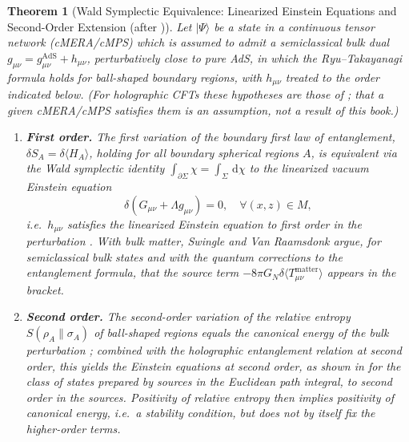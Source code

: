 \documentclass[11pt,a4paper,reqno]{amsart}
\newtheorem{theorem}{Theorem}[section]
\theoremstyle{definition}
\numberwithin{equation}{section}
\newcommand{\dif}{\,\mathrm{d}}
\begin{document}
\begin{theorem}[Wald Symplectic Equivalence: Linearized Einstein Equations and Second-Order Extension (after \cite{faulkner2014gravitation, faulkner2017nonlinear})]
\label{thm:grand_einstein_emergence}
Let $|\Psi\rangle$ be a state in a continuous tensor network (cMERA/cMPS) which is \emph{assumed} to admit a semiclassical bulk dual $g_{\mu\nu} = g_{\mu\nu}^{\mathrm{AdS}} + h_{\mu\nu}$, perturbatively close to pure AdS, in which the Ryu--Takayanagi formula holds for ball-shaped boundary regions, with $h_{\mu\nu}$ treated to the order indicated below. (For holographic CFTs these hypotheses are those of \cite{faulkner2014gravitation, faulkner2017nonlinear}; that a given cMERA/cMPS satisfies them is an assumption, not a result of this book.)
\begin{enumerate}[label=(\roman*)]
    \item \textbf{First order.} The first variation of the boundary first law of entanglement, $\delta S_A = \delta \langle H_A \rangle$, holding for all boundary spherical regions $A$, is equivalent via the Wald symplectic identity $\int_{\partial \Sigma} \chi = \int_\Sigma \dif \chi$ to the \emph{linearized} vacuum Einstein equation
    \begin{equation}
        \delta\!\left( G_{\mu\nu} + \Lambda g_{\mu\nu} \right) = 0, \quad \forall (x, z) \in M,
    \end{equation}
    i.e.\ $h_{\mu\nu}$ satisfies the linearized Einstein equation to first order in the perturbation \cite{faulkner2014gravitation}. With bulk matter, Swingle and Van Raamsdonk \cite{swingle2014universality} argue, for semiclassical bulk states and with the quantum corrections to the entanglement formula, that the source term $-8\pi G_N \delta\langle T_{\mu\nu}^{\mathrm{matter}}\rangle$ appears in the bracket.
    \item \textbf{Second order.} The second-order variation of the relative entropy $S(\rho_A \| \sigma_A)$ of ball-shaped regions equals the canonical energy of the bulk perturbation \cite{lashkari2016canonical}; combined with the holographic entanglement relation at second order, this yields the Einstein equations at second order, as shown in \cite{faulkner2017nonlinear} for the class of states prepared by sources in the Euclidean path integral, to second order in the sources. Positivity of relative entropy then implies positivity of canonical energy, i.e.\ a stability condition, but does not by itself fix the higher-order terms.
\end{enumerate}
\end{theorem}
\end{document}
